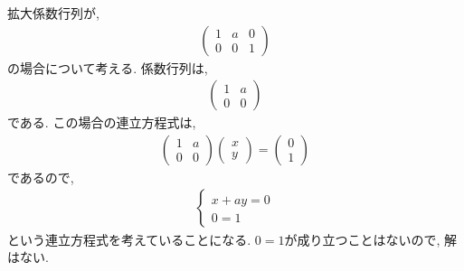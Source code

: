 \begin{example}
    \label{eg:eq:reduced:2}
  拡大係数行列が,
  \begin{align*}
    \begin{pmatrix}
      1&a&0\\0&0&1
    \end{pmatrix}
  \end{align*}
  の場合について考える.
  係数行列は,
  \begin{align*}
    \begin{pmatrix}
      1&a\\0&0
    \end{pmatrix}
  \end{align*}
  である.
  この場合の連立方程式は,
  \begin{align*}
    \begin{pmatrix}
      1&a\\0&0
    \end{pmatrix}
    \begin{pmatrix}x\\y\end{pmatrix}
      =
      \begin{pmatrix}
        0\\1
      \end{pmatrix}
  \end{align*}
  であるので,
  \begin{align*}
    \begin{cases}
      x+ay=0\\
      0=1
    \end{cases}
  \end{align*}
  という連立方程式を考えていることになる.
  $0=1$が成り立つことはないので,
  解はない.
\end{example}



